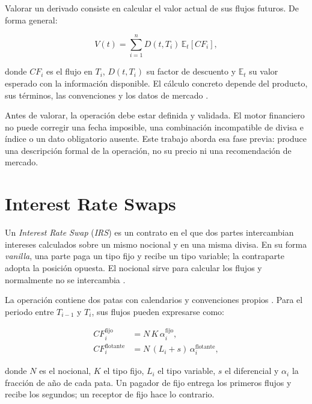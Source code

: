 Valorar un derivado consiste en calcular el valor actual de sus flujos futuros. De forma general:

\begin{equation}
V(t)=\sum_{i=1}^{n}D(t,T_i)\,\mathbb{E}_t[CF_i],
\end{equation}

donde \(CF_i\) es el flujo en \(T_i\), \(D(t,T_i)\) su factor de descuento y \(\mathbb{E}_t\) su valor esperado con la información disponible. El cálculo concreto depende del producto, sus términos, las convenciones y los datos de mercado \citep{ausin2025quantitative}.

Antes de valorar, la operación debe estar definida y validada. El motor financiero no puede corregir una fecha imposible, una combinación incompatible de divisa e índice o un dato obligatorio ausente. Este trabajo aborda esa fase previa: produce una descripción formal de la operación, no su precio ni una recomendación de mercado.

\section{Interest Rate Swaps}
\label{sec:interest_rate_swaps}

Un \textit{Interest Rate Swap} (\textit{IRS}) es un contrato en el que dos partes intercambian intereses calculados sobre un mismo nocional y en una misma divisa. En su forma \textit{vanilla}, una parte paga un tipo fijo y recibe un tipo variable; la contraparte adopta la posición opuesta. El nocional sirve para calcular los flujos y normalmente no se intercambia \citep{hull2021derivatives}.

La operación contiene dos patas con calendarios y convenciones propios \citep[Definición~2.19, p.~59]{ausin2025quantitative}. Para el periodo entre \(T_{i-1}\) y \(T_i\), sus flujos pueden expresarse como:

\begin{align}
CF^{\text{fijo}}_i &= N\,K\,\alpha^{\text{fijo}}_i,\\
CF^{\text{flotante}}_i &= N\,(L_i+s)\,\alpha^{\text{flotante}}_i,
\end{align}

donde \(N\) es el nocional, \(K\) el tipo fijo, \(L_i\) el tipo variable, \(s\) el diferencial y \(\alpha_i\) la fracción de año de cada pata. Un pagador de fijo entrega los primeros flujos y recibe los segundos; un receptor de fijo hace lo contrario.

